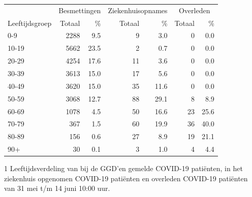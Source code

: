 \documentclass[
  english,
  man,floatsintext]{apa6}
\begin{document}
\begin{table}
\centering\begingroup\fontsize{11}{13}\selectfont

\begin{threeparttable}
\begin{tabular}{lrrrrrr}
\toprule
\multicolumn{1}{c}{ } & \multicolumn{2}{c}{Besmettingen} & \multicolumn{2}{c}{Ziekenhuisopnames} & \multicolumn{2}{c}{Overleden} \\
\cmidrule(l{3pt}r{3pt}){2-3} \cmidrule(l{3pt}r{3pt}){4-5} \cmidrule(l{3pt}r{3pt}){6-7}
Leeftijdsgroep & Totaal & \% & Totaal & \% & Totaal & \%\\
\midrule
0-9 & 2288 & 9.5 & 9 & 3.0 & 0 & 0.0\\
10-19 & 5662 & 23.5 & 2 & 0.7 & 0 & 0.0\\
20-29 & 4254 & 17.6 & 11 & 3.6 & 0 & 0.0\\
30-39 & 3613 & 15.0 & 17 & 5.6 & 0 & 0.0\\
40-49 & 3620 & 15.0 & 35 & 11.6 & 0 & 0.0\\
50-59 & 3068 & 12.7 & 88 & 29.1 & 8 & 8.9\\
60-69 & 1078 & 4.5 & 50 & 16.6 & 23 & 25.6\\
70-79 & 367 & 1.5 & 60 & 19.9 & 36 & 40.0\\
80-89 & 156 & 0.6 & 27 & 8.9 & 19 & 21.1\\
90+ & 30 & 0.1 & 3 & 1.0 & 4 & 4.4\\
\bottomrule
\end{tabular}
\begin{tablenotes}
\item[1] Leeftijdsverdeling van bij de GGD’en gemelde COVID-19 patiënten, in het ziekenhuis opgenomen COVID-19 patiënten en overleden COVID-19 patiënten van 31 mei t/m 14 juni 10:00 uur.
\end{tablenotes}
\end{threeparttable}
\endgroup{}
\end{table}

\newpage
\end{document}
